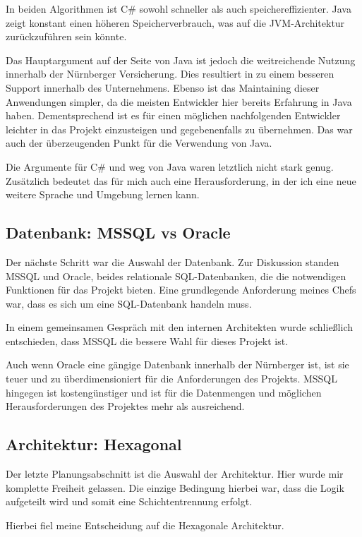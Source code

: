 In beiden Algorithmen ist C\# sowohl schneller als auch speichereffizienter. 
Java zeigt konstant einen höheren Speicherverbrauch, was auf die JVM-Architektur zurückzuführen sein könnte.

Das Hauptargument auf der Seite von Java ist jedoch die weitreichende Nutzung innerhalb der Nürnberger Versicherung. Dies resultiert in zu einem besseren Support innerhalb des Unternehmens.
Ebenso ist das Maintaining dieser Anwendungen simpler, da die meisten Entwickler hier bereits Erfahrung in Java haben. Dementsprechend ist es für einen möglichen nachfolgenden Entwickler leichter
in das Projekt einzusteigen und gegebenenfalls zu übernehmen.
Das war auch der überzeugenden Punkt für die Verwendung von Java. 

Die Argumente für C\# und weg von Java waren letztlich nicht stark genug.
Zusätzlich bedeutet das für mich auch eine Herausforderung, in der ich eine neue weitere Sprache und Umgebung lernen kann.

\subsection{Datenbank: MSSQL vs Oracle}
Der nächste Schritt war die Auswahl der Datenbank. Zur Diskussion standen MSSQL und Oracle, beides relationale SQL-Datenbanken, 
die die notwendigen Funktionen für das Projekt bieten. Eine grundlegende Anforderung meines Chefs war, dass es sich um eine SQL-Datenbank handeln muss.

In einem gemeinsamen Gespräch mit den internen Architekten wurde schließlich entschieden, dass MSSQL die bessere Wahl für dieses Projekt ist.

Auch wenn Oracle eine gängige Datenbank innerhalb der Nürnberger ist, ist sie teuer und zu überdimensioniert für die Anforderungen des Projekts.
MSSQL hingegen ist kostengünstiger und ist für die Datenmengen und möglichen Herausforderungen des Projektes mehr als ausreichend. \cite{petri2005comparison}

\subsection{Architektur: Hexagonal}
Der letzte Planungsabschnitt ist die Auswahl der Architektur. Hier wurde mir komplette Freiheit gelassen.
Die einzige Bedingung hierbei war, dass die Logik aufgeteilt wird und somit eine Schichtentrennung erfolgt.

Hierbei fiel meine Entscheidung auf die Hexagonale Architektur.

